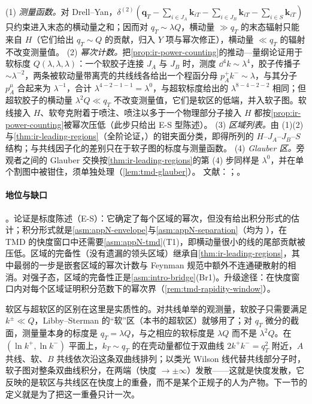 \begin{proofsketch}
(1) \emph{测量函数。}对 Drell--Yan，$\delta^{(2)}(\mathbf q_T-\sum_{i\in J_A}\mathbf k_{iT}-\sum_{i\in J_B}\mathbf k_{iT}-\sum_{i\in S}\mathbf k_{iT})$ 只约束进入末态的横动量之和；因而对 $q_T\sim\lambda Q$，横动量 $\gg q_T$ 的末态辐射只能来自 $H$（它们给出 $q_T\sim Q$ 的贡献，归入 $Y$ 项与幂次修正），横动量 $\ll q_T$ 的辐射不改变测量值。
(2) \emph{幂次计数。}把\cref{prop:ir-power-counting}的推动—量纲论证用于软标度 $Q(\lambda,\lambda,\lambda)$：一个软胶子连接 $J_A$ 与 $J_B$ 时，测度 $\dd^4k\sim\lambda^4$，胶子传播子 $\sim\lambda^{-2}$，两条被软动量带离壳的共线线各给出一个程函分母 $p_A^+k^-\sim\lambda$，与其分子 $p_A^\mu$ 合起来为 $\lambda^{-1}$，合计 $\lambda^{4-2-1-1}=\lambda^0$，与超软标度给出的 $\lambda^{8-4-2-2}$ 相同；但超软胶子的横动量 $\lambda^2Q\ll q_T$ 不改变测量值，它们是软区的低端，并入软子图。软线接入 $H$、软夸克附着于喷注、喷注以多于一个物理部分子接入 $H$ 都按\cref{prop:ir-power-counting}被幂次压低（此步只给出 E-S 型陈述）。
(3) \emph{区域列表。}由 (1)(2) 与\cref{thm:ir-leading-regions}（全阶论证，\tagA）的钳夹面分类，即得所列的 $H$--$J_A$--$J_B$--$S$ 结构；与共线因子化的差别只在于软子图的标度与测量函数。
(4) \emph{Glauber 区。}旁观者之间的 Glauber 交换按\cref{thm:ir-leading-regions}的第 (4) 步同样是 $\lambda^0$，并在单个割图中被钳住，须单独处理（\cref{lem:tmd-glauber}）。
文献：\cite{CollinsSoper1981}；\cite[第~10~章与第~13.3~节]{Collins2011}。
\end{proofsketch}

\paragraph{地位与缺口}\tagA。论证是标度陈述（E-S）：它确定了每个区域的幂次，但没有给出积分形式的估计；积分形式就是\cref{asm:appN-envelope}与\cref{asm:appN-separation}（均为 \tagA），在 TMD 的快度窗口中还需要\cref{asm:appN-tmd}(T1)，即横动量很小的线的尾部贡献被压低。区域的完备性（没有遗漏的领头区域）继承自\cref{thm:ir-leading-regions}，其中最弱的一步是嵌套区域的幂次计数与 Feynman 规范中额外不连通硬散射的相消\cite[第~14.4.8~节]{Collins2011}。对强子态，区域的完备性正是\cref{asm:intro-bridge}(Br1)。升级途径：在快度窗口内对每个区域证明积分范数下的幂次界（\cref{rem:tmd-rapidity-window}）。

软区与超软区的区别在这里是实质性的。对共线单举的观测量，软胶子只需要满足 $k^\pm\ll Q$，Libby--Sterman 的“软”区（本书的超软区）就够用了；对 $q_T$ 微分的截面，测量量本身的标度是 $q_T=\lambda Q$，与之相应的软标度是 $\lambda Q$ 而不是 $\lambda^2Q$。在 $(\ln k^+,\ln k^-)$ 平面上，$k_T\sim q_T$ 的在壳动量都位于双曲线 $2k^+k^-=q_T^2$ 附近，$A$ 共线、软、$B$ 共线依次沿这条双曲线排列；以类光 Wilson 线代替共线部分子时，软子图对整条双曲线积分，在两端（快度 $\to\pm\infty$）发散——这就是快度发散，它反映的是软区与共线区在快度上的重叠，而不是某个正规子的人为产物。下一节的定义就是为了把这一重叠只计一次。
